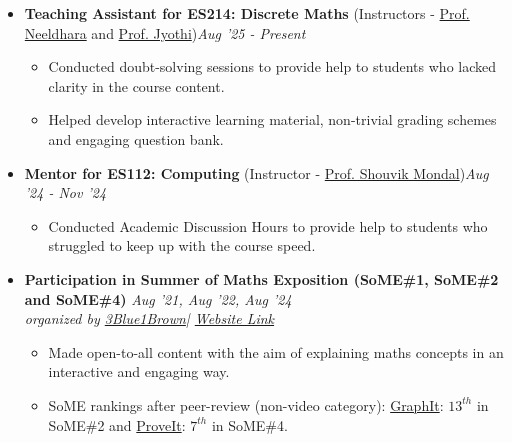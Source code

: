 \documentclass[a4paper,10pt]{article}
\newcommand{\isep}{-2 pt}
\begin{document}
\begin{itemize}

\item \textbf{Teaching Assistant for ES214: Discrete Maths}  (Instructors - \href{https://www.neeldhara.com/}{ Prof. Neeldhara} and \href{https://iitgn.ac.in/faculty/cl/jyothi}{Prof. Jyothi})\hfill \emph{Aug '25 - Present}
 \\[-0.6cm]
\begin{itemize}\itemsep \isep
    \item Conducted doubt-solving sessions to provide help to students who lacked clarity in the course content.
    \item Helped develop interactive learning material, non-trivial grading schemes and engaging question bank.
\end{itemize}

\item \textbf{Mentor for ES112: Computing}  (Instructor - \href{https://iitgn.ac.in/faculty/cse/shouvick}{ Prof. Shouvik Mondal})\hfill \emph{Aug '24 - Nov '24}
 \\[-0.6cm]
\begin{itemize}\itemsep \isep
    \item Conducted Academic Discussion Hours to provide help to students who struggled to keep up with the course speed.
\end{itemize}
\item \textbf{Participation in Summer of Maths Exposition (SoME\#1, SoME\#2 and SoME\#4)} \hfill \emph{Aug '21, Aug '22, Aug '24}\\ \emph{organized by \href{https://www.3blue1brown.com/}{3Blue1Brown}| \href{https://some.3b1b.co/}{Website Link}}
 \\[-0.7cm]
\begin{itemize}\itemsep \isep
    \item Made open-to-all content with the aim of explaining maths concepts in an interactive and engaging way.
    \item SoME rankings after peer-review (non-video category): \href{https://voxelrifts.itch.io/graphit}{GraphIt}: $13^{th}$ in SoME\#2 and \href{https://voxelrifts.itch.io/proveit}{ProveIt}: $7^{th}$ in SoME\#4.
\end{itemize}


\end{itemize}
\end{document}
